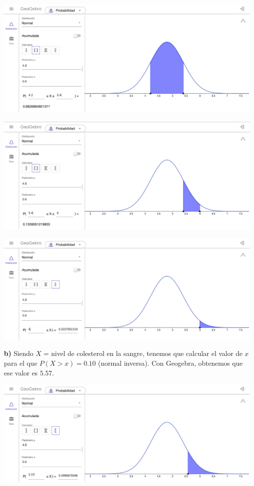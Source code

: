 \documentclass[
]{book}
\begin{document}
\includegraphics[width=28.44in]{img/3_10}

\includegraphics[width=28.44in]{img/3_11}

\includegraphics[width=28.44in]{img/3_12}

\textbf{b)} Siendo \(X\) = nivel de colesterol en la sangre, tenemos que calcular el valor de \(x\) para el que \(P(X > x) = 0.10\) (normal inversa). Con Geogebra, obtenemos que ese valor es \(5.57\).

\includegraphics[width=28.44in]{img/3_13}
\end{document}
